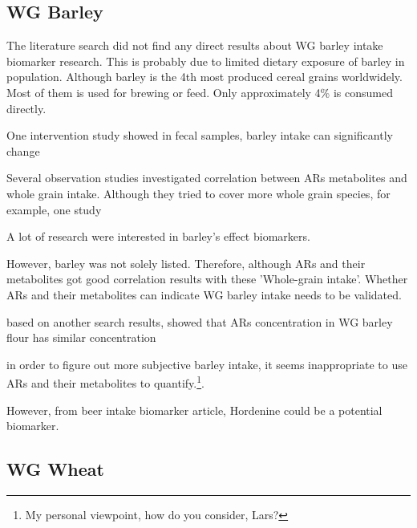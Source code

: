 \subsection{WG Barley}
The literature search did not find any direct results about WG barley intake biomarker research. This is probably due to limited dietary exposure of barley in population. Although barley is the 4th most produced cereal grains worldwidely. Most of them is used for brewing or feed. Only approximately 4\% is consumed directly\cite{Baik2008}.

One intervention study\cite{DeAngelis2015} showed in fecal samples, barley intake can significantly change 

Several observation studies investigated correlation between ARs metabolites and whole grain intake. Although they tried to cover more whole grain species, for example, one study 

A lot of research were interested in barley's effect biomarkers. 

 However, barley was not solely listed. Therefore, although ARs and their metabolites got good correlation results with these 'Whole-grain intake'. Whether ARs and their metabolites can indicate WG barley intake needs to be validated.

based on another search results, showed that ARs concentration in WG barley flour has similar concentration 

in order to figure out more subjective barley intake, it seems inappropriate to use ARs and their metabolites to quantify.\footnote{My personal viewpoint, how do you consider, Lars?}.


However, from beer intake biomarker article\cite{Gurdeniz2016}, Hordenine could be a potential biomarker.


\subsection{WG Wheat}